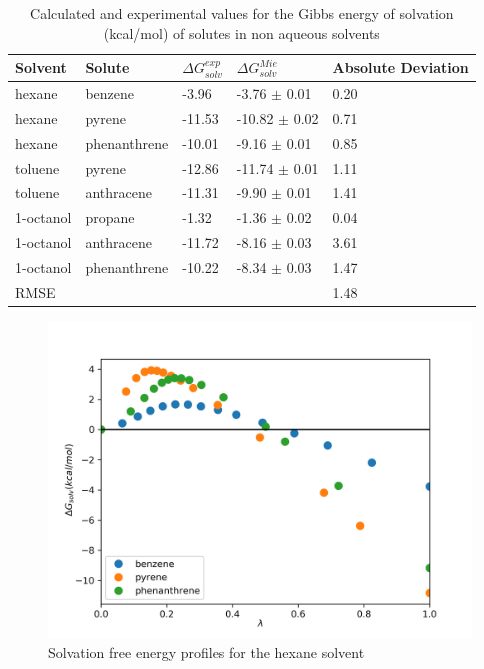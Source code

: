 \begin{table}[h]
\centering
  \caption{Calculated and experimental values for the Gibbs energy of solvation (kcal/mol) of solutes in non aqueous solvents}
  \label{tbl:solv1}
  \begin{tabular}{lllll}
    \hline
      Solvent & Solute & $\Delta G_{solv}^{exp}$ & $\Delta G_{solv}^{Mie}$ & Absolute Deviation \\
    \hline
    hexane    & benzene      & -3.96  & -3.76  $\pm$ 0.01 & 0.20 \\
    hexane    & pyrene       & -11.53 & -10.82 $\pm$ 0.02 & 0.71 \\
    hexane    & phenanthrene & -10.01 & -9.16  $\pm$ 0.01 & 0.85 \\
    toluene   & pyrene       & -12.86 & -11.74 $\pm$ 0.01 & 1.11\\
    toluene   & anthracene   & -11.31 & -9.90 $\pm$ 0.01 & 1.41\\
    1-octanol & propane      & -1.32  & -1.36  $\pm$ 0.02 & 0.04 \\
    1-octanol & anthracene   & -11.72 & -8.16  $\pm$ 0.03 & 3.61 \\
    1-octanol & phenanthrene & -10.22 & -8.34  $\pm$ 0.03 & 1.47 \\
    \hline
    RMSE      &              &        &                   & 1.48     \\
    \hline
  \end{tabular}
\end{table}

\begin{figure}
\centering
\includegraphics[width=0.9\linewidth]{Figures/hex}
\caption{Solvation free energy profiles for the hexane solvent}
\label{fig:hex}
\end{figure}

